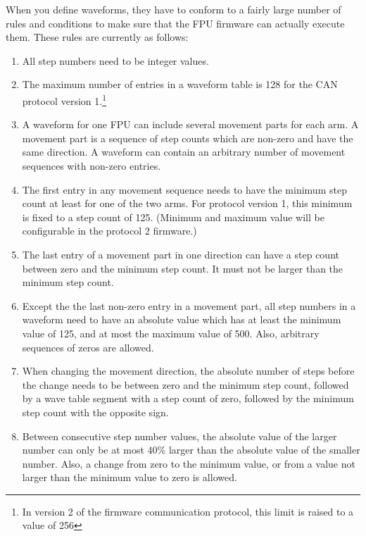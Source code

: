\documentclass[11pt,a4paper]{report}
\begin{document}
When you define waveforms, they have to conform to a fairly large
number of rules and conditions to make sure that the FPU firmware can
actually execute them. These rules are currently as follows:

\begin{enumerate}

\item All step numbers need to be integer values.

\item The maximum number of entries in a waveform table is 128 for the
  CAN protocol version 1.\footnote{In version 2 of the firmware
    communication protocol, this limit is raised to a value of 256}
  
\item A waveform for one FPU can include several movement parts for
  each arm. A movement part is a sequence of step counts which are
  non-zero and have the same direction.  A waveform can contain an
  arbitrary number of movement sequences with non-zero entries.

\item The first entry in any movement sequence needs to have the
  minimum step count at least for one of the two arms.  For protocol
  version 1, this minimum is fixed to a step count of 125. (Minimum
  and maximum value will be configurable in the protocol 2 firmware.)

\item The last entry of a movement part in one direction can have a
  step count between zero and the minimum step count. It must not be
  larger than the minimum step count.
  
\item Except the the last non-zero entry in a movement part, all step
  numbers in a waveform need to have an absolute value which has at
  least the minimum value of 125, and at most the maximum value of
  500. Also, arbitrary sequences of zeros are allowed.

\item When changing the movement direction, the absolute number of
  steps before the change needs to be between zero and the minimum
  step count, followed by a wave table segment with a step count of
  zero, followed by the minimum step count with the opposite sign.

\item Between consecutive step number values, the absolute value of
  the larger number can only be at most 40\% larger than the absolute
  value of the smaller number. Also, a change from zero to the minimum
  value, or from a value not larger than the minimum value to zero is
  allowed.

  
\end{enumerate}
\end{document}
